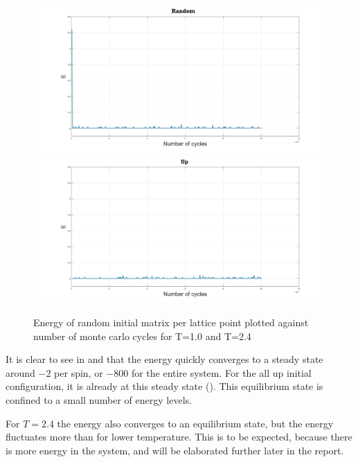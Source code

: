 \documentclass[10pt,a4paper]{article}
\begin{document}
\begin{figure} [H]
\centerline{
\includegraphics[scale=0.15]{RANDOMenergy1.jpg}
\includegraphics[scale=0.15]{UPenergy1.jpg}
}
\caption{Energy of random initial matrix per lattice point plotted against number of monte carlo cycles for T=1.0 and T=2.4}
\label{fig:EnergyPerCycle1}
\end{figure}

\noindent It is clear to see in  and  that the energy quickly converges to a steady state around $-2$ per spin, or $-800$ for the entire system. For the all up initial configuration, it is already at this steady state (). This equilibrium state is confined to a small number of energy levels.  

For $T=2.4$ the energy also converges to an equilibrium state, but the energy fluctuates more than for lower temperature. This is to be expected, because there is more energy in the system, and will be elaborated further later in the report.
\end{document}
